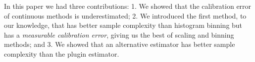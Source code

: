 In this paper we had three contributions: 1. We showed that the calibration error of continuous methods is underestimated; 2. We introduced the first method, to our knowledge, that has better sample complexity than histogram binning but has a \emph{measurable calibration error}, giving us the best of scaling and binning methods; and 3. We showed that an alternative estimator has better sample complexity than the plugin estimator.
